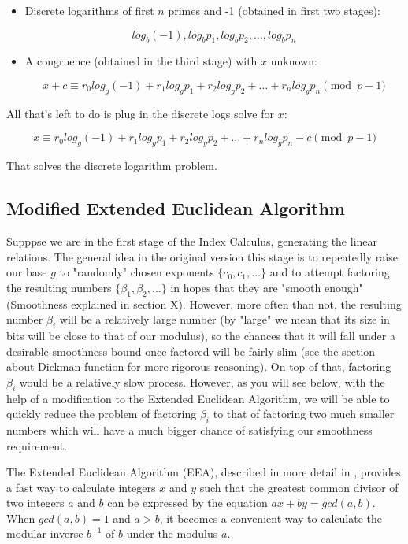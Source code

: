 \documentclass{article}
\begin{document}
        \begin{itemize}

          \item Discrete logarithms of first $n$ primes and -1 (obtained in first two stages):

            $$log_b(-1), log_b p_1, log_b p_2, \ldots, log_b p_n$$

          \item A congruence (obtained in the third stage) with $x$ unknown:

            $$x + c \equiv r_0 log_g (-1) + r_1 log_g p_1 + r_2 log_g p_2 + \ldots + r_n log_g p_n \pmod{p-1}$$

        \end{itemize}

        All that's left to do is plug in the discrete logs solve for $x$:

        $$x \equiv r_0 log_g (-1) + r_1 log_g p_1 + r_2 log_g p_2 + \ldots + r_n log_g p_n - c \pmod{p-1}$$

        That solves the discrete logarithm problem.

        \subsection{Modified Extended Euclidean Algorithm}

        Supppse we are in the first stage of the Index Calculus, generating the linear relations. The general idea in the original version this stage is to repeatedly raise our base $g$ to "randomly" chosen exponents $\{c_0, c_1, \ldots \}$ and to attempt factoring the resulting numbers $\{\beta_1, \beta_2, \ldots \}$ in hopes that they are "smooth enough" (Smoothness explained in section X). However, more often than not, the resulting number $\beta_i$ will be a relatively large number (by "large" we mean that its size in bits will be close to that of our modulus), so the chances that it will fall under a desirable smoothness bound once factored will be fairly slim (see the section about Dickman function for more rigorous reasoning). On top of that, factoring $\beta_i$ would be a relatively slow process. However, as you will see below, with the help of a modification to the Extended Euclidean Algorithm, we will be able to quickly reduce the problem of factoring $\beta_i$ to that of factoring two much smaller numbers which will have a much bigger chance of satisfying our smoothness requirement.

        The Extended Euclidean Algorithm (EEA), described in more detail in \autocite{Rosen2002}, provides a fast way to calculate integers $x$ and $y$ such that the greatest common divisor of two integers $a$ and $b$ can be expressed by the equation $ax + by = gcd(a,b)$. When $gcd(a,b) = 1$ and $a > b$, it becomes a convenient way to calculate the modular inverse $b^{-1}$ of $b$ under the modulus $a$.
\end{document}
